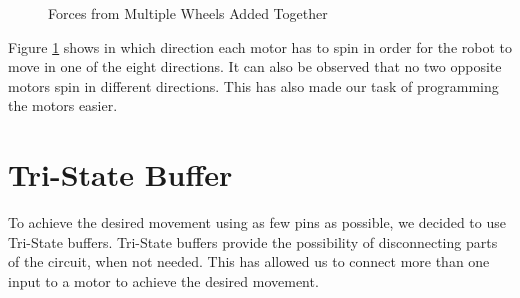 \begin{figure}[htp]
\begin{center}
{    }
    \end{center}
    \begin{center}
	\end{center}
  	\caption{Forces from Multiple Wheels Added Together}
  	\label{fig:forces}
\end{figure}
Figure \ref{fig:forces} shows in which direction each motor has to spin in order for the robot to move in one of the eight directions. It can also be observed that no two opposite motors spin in different directions. This has also made our task of programming the motors easier. 
\clearpage
\section{Tri-State Buffer}
To achieve the desired movement using as few pins as possible, we decided to use Tri-State buffers.
Tri-State buffers provide the possibility of disconnecting parts of the circuit, when not needed.
This has allowed us to connect more than one input to a motor to achieve the desired movement.

